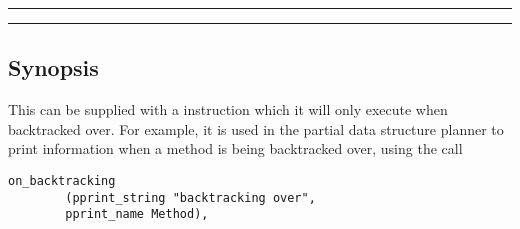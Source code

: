 \vspace{2mm}
\hrule
\vspace{2mm}
\begin{Large}
\end{Large}
\vspace{2mm}
\hrule
\vspace{2mm}


\subsection*{Synopsis}
This can be supplied with a \lprolog instruction which it will only
execute when backtracked over.  For example, it is used in the partial 
data structure planner to print information when a
method is being backtracked over, using the call

\begin{verbatim}
on_backtracking 
        (pprint_string "backtracking over",
        pprint_name Method),
\end{verbatim}
